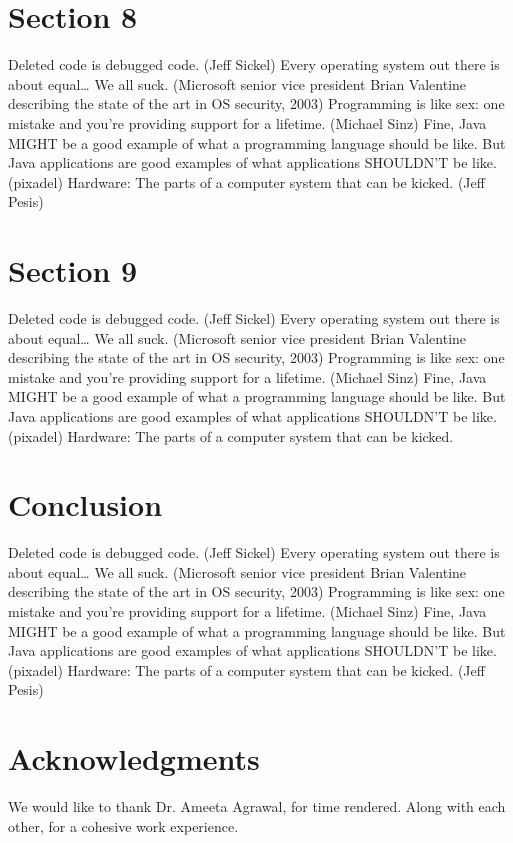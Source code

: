\documentclass[11pt,a4paper]{article}
\begin{document}
\section{Section 8}
\label{ssec:accessibility}

Deleted code is debugged code. (Jeff Sickel) Every operating system out there is about equal… We all suck. (Microsoft senior vice president Brian Valentine describing the state of the art in OS security, 2003) Programming is like sex: one mistake and you’re providing support for a lifetime. (Michael Sinz) Fine, Java MIGHT be a good example of what a programming language should be like. But Java applications are good examples of what applications SHOULDN’T be like. (pixadel) Hardware: The parts of a computer system that can be kicked. (Jeff Pesis)

\section{Section 9}

Deleted code is debugged code. (Jeff Sickel) Every operating system out there is about equal… We all suck. (Microsoft senior vice president Brian Valentine describing the state of the art in OS security, 2003) Programming is like sex: one mistake and you’re providing support for a lifetime. (Michael Sinz) Fine, Java MIGHT be a good example of what a programming language should be like. But Java applications are good examples of what applications SHOULDN’T be like. (pixadel) Hardware: The parts of a computer system that can be kicked. 

\section{Conclusion}

Deleted code is debugged code. (Jeff Sickel) Every operating system out there is about equal… We all suck. (Microsoft senior vice president Brian Valentine describing the state of the art in OS security, 2003) Programming is like sex: one mistake and you’re providing support for a lifetime. (Michael Sinz) Fine, Java MIGHT be a good example of what a programming language should be like. But Java applications are good examples of what applications SHOULDN’T be like. (pixadel) Hardware: The parts of a computer system that can be kicked. (Jeff Pesis)

\section*{Acknowledgments}

We would like to thank Dr. Ameeta Agrawal, for time rendered. Along with each other, for a cohesive work experience. 

\nocite{*} 
\printbibliography[title={Bibliography}] 

%
%

\end{document}
